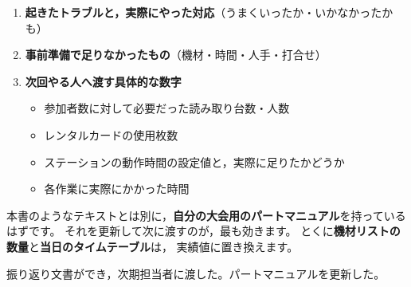 \begin{enumerate}
\item \textbf{起きたトラブルと，実際にやった対応}（うまくいったか・いかなかったかも）
\item \textbf{事前準備で足りなかったもの}（機材・時間・人手・打合せ）
\item \textbf{次回やる人へ渡す具体的な数字}
      \begin{itemize}
      \item 参加者数に対して必要だった読み取り台数・人数
      \item レンタルカードの使用枚数
      \item ステーションの動作時間の設定値と，実際に足りたかどうか
      \item 各作業に実際にかかった時間
      \end{itemize}
\end{enumerate}

\begin{Note}[パートマニュアルを更新する]
本書のようなテキストとは別に，\textbf{自分の大会用のパートマニュアル}を持っているはずです。
それを更新して次に渡すのが，最も効きます。
とくに\textbf{機材リストの数量}と\textbf{当日のタイムテーブル}は，
実績値に置き換えます。
\end{Note}

\begin{Done}
振り返り文書ができ，次期担当者に渡した。パートマニュアルを更新した。
\end{Done}
